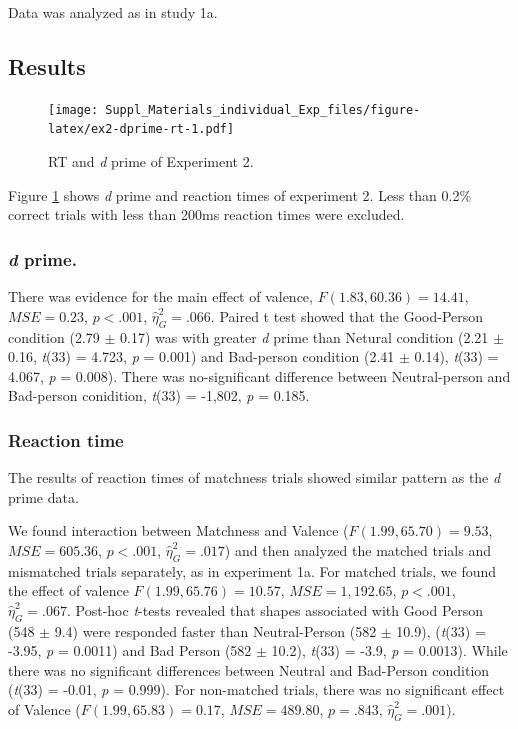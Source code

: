 \documentclass[
  english,
  man]{apa6}
\begin{document}
Data was analyzed as in study 1a.

\hypertarget{results-3}{%
\subsection{Results}\label{results-3}}

\begin{figure}
\centering
\texttt{[image: Suppl\_Materials\_individual\_Exp\_files/figure-latex/ex2-dprime-rt-1.pdf]}
\caption{\label{fig:ex2-dprime-rt}RT and \emph{d} prime of Experiment 2.}
\end{figure}

Figure \ref{fig:ex2-dprime-rt} shows \emph{d} prime and reaction times of experiment 2. Less than 0.2\% correct trials with less than 200ms reaction times were excluded.

\hypertarget{d-prime.}{%
\subsubsection{\texorpdfstring{\emph{d} prime.}{d prime.}}\label{d-prime.}}

There was evidence for the main effect of valence, \(F(1.83, 60.36) = 14.41\), \(\mathit{MSE} = 0.23\), \(p < .001\), \(\hat{\eta}^2_G = .066\). Paired t test showed that the Good-Person condition (2.79 \(\pm\) 0.17) was with greater \emph{d} prime than Netural condition (2.21 \(\pm\) 0.16, \emph{t}(33) = 4.723, \emph{p} = 0.001) and Bad-person condition (2.41 \(\pm\) 0.14), \emph{t}(33) = 4.067, \emph{p} = 0.008). There was no-significant difference between Neutral-person and Bad-person conidition, \emph{t}(33) = -1,802, \emph{p} = 0.185.

\hypertarget{reaction-time-3}{%
\subsubsection{Reaction time}\label{reaction-time-3}}

The results of reaction times of matchness trials showed similar pattern as the \emph{d} prime data.

We found interaction between Matchness and Valence (\(F(1.99, 65.70) = 9.53\), \(\mathit{MSE} = 605.36\), \(p < .001\), \(\hat{\eta}^2_G = .017\)) and then analyzed the matched trials and mismatched trials separately, as in experiment 1a. For matched trials, we found the effect of valence \(F(1.99, 65.76) = 10.57\), \(\mathit{MSE} = 1,192.65\), \(p < .001\), \(\hat{\eta}^2_G = .067\). Post-hoc \emph{t}-tests revealed that shapes associated with Good Person (548 \(\pm\) 9.4) were responded faster than Neutral-Person (582 \(\pm\) 10.9), (\emph{t}(33) = -3.95, \emph{p} = 0.0011) and Bad Person (582 \(\pm\) 10.2), \emph{t}(33) = -3.9, \emph{p} = 0.0013). While there was no significant differences between Neutral and Bad-Person condition (\emph{t}(33) = -0.01, \emph{p} = 0.999). For non-matched trials, there was no significant effect of Valence (\(F(1.99, 65.83) = 0.17\), \(\mathit{MSE} = 489.80\), \(p = .843\), \(\hat{\eta}^2_G = .001\)).
\end{document}
